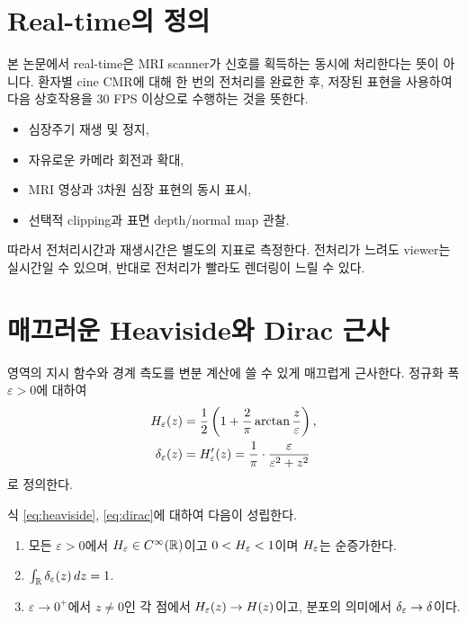 
\section{Real-time의 정의}

본 논문에서 real-time은 MRI scanner가 신호를 획득하는 동시에 처리한다는 뜻이
아니다. 환자별 cine CMR에 대해 한 번의 전처리를 완료한 후, 저장된 표현을 사용하여
다음 상호작용을 30 FPS 이상으로 수행하는 것을 뜻한다.

\begin{itemize}[leftmargin=2em]
  \item 심장주기 재생 및 정지,
  \item 자유로운 카메라 회전과 확대,
  \item MRI 영상과 3차원 심장 표현의 동시 표시,
  \item 선택적 clipping과 표면 depth/normal map 관찰.
\end{itemize}

따라서 전처리시간과 재생시간은 별도의 지표로 측정한다. 전처리가 느려도 viewer는
실시간일 수 있으며, 반대로 전처리가 빨라도 렌더링이 느릴 수 있다.

\section{매끄러운 Heaviside와 Dirac 근사}

영역의 지시 함수와 경계 측도를 변분 계산에 쓸 수 있게 매끄럽게 근사한다. 정규화
폭 $\varepsilon > 0$에 대하여
\begin{align}
  H_\varepsilon(z) &= \frac{1}{2}\left(1 + \frac{2}{\pi}\arctan\frac{z}{\varepsilon}\right),
  \label{eq:heaviside}\\
  \delta_\varepsilon(z) &= H_\varepsilon'(z)
  = \frac{1}{\pi}\cdot\frac{\varepsilon}{\varepsilon^2 + z^2}
  \label{eq:dirac}
\end{align}
로 정의한다.

\begin{proposition}[근사의 기본 성질]
\label{prop:heaviside}
식 \eqref{eq:heaviside}, \eqref{eq:dirac}에 대하여 다음이 성립한다.
\begin{enumerate}[label=(\roman*)]
  \item 모든 $\varepsilon>0$에서 $H_\varepsilon \in C^\infty(\mathbb{R})$이고
  $0 < H_\varepsilon < 1$이며 $H_\varepsilon$는 순증가한다.
  \item $\int_{\mathbb{R}} \delta_\varepsilon(z)\,dz = 1$.
  \item $\varepsilon \to 0^+$에서 $z \ne 0$인 각 점에서 $H_\varepsilon(z) \to H(z)$이고,
  분포의 의미에서 $\delta_\varepsilon \to \delta$이다.
\end{enumerate}
\end{proposition}

